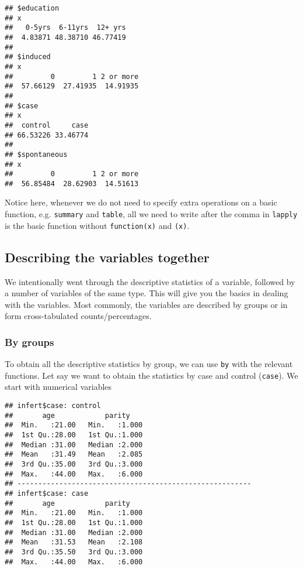 \documentclass[]{book}
\newenvironment{Shaded}{\begin{snugshade}}{\end{snugshade}}
\newcommand{\KeywordTok}[1]{\textcolor[rgb]{0.13,0.29,0.53}{\textbf{{#1}}}}
\newcommand{\StringTok}[1]{\textcolor[rgb]{0.31,0.60,0.02}{{#1}}}
\newcommand{\NormalTok}[1]{{#1}}
\theoremstyle{definition}
\theoremstyle{definition}
\theoremstyle{remark}
\begin{document}
\begin{verbatim}
## $education
## x
##   0-5yrs  6-11yrs  12+ yrs 
##  4.83871 48.38710 46.77419 
## 
## $induced
## x
##         0         1 2 or more 
##  57.66129  27.41935  14.91935 
## 
## $case
## x
##  control     case 
## 66.53226 33.46774 
## 
## $spontaneous
## x
##         0         1 2 or more 
##  56.85484  28.62903  14.51613
\end{verbatim}

Notice here, whenever we do not need to specify extra operations on a
basic function, e.g. \texttt{summary} and \texttt{table}, all we need to
write after the comma in \texttt{lapply} is the basic function without
\texttt{function(x)} and \texttt{(x)}.

\subsection{Describing the variables
together}\label{describing-the-variables-together}

We intentionally went through the descriptive statistics of a variable,
followed by a number of variables of the same type. This will give you
the basics in dealing with the variables. Most commonly, the variables
are described by groups or in form cross-tabulated counts/percentages.

\subsubsection{By groups}\label{by-groups}

To obtain all the descriptive statistics by group, we can use
\texttt{by} with the relevant functions. Let say we want to obtain the
statistics by case and control (\texttt{case}). We start with numerical
variables

\begin{Shaded}
\end{Shaded}

\begin{verbatim}
## infert$case: control
##       age            parity     
##  Min.   :21.00   Min.   :1.000  
##  1st Qu.:28.00   1st Qu.:1.000  
##  Median :31.00   Median :2.000  
##  Mean   :31.49   Mean   :2.085  
##  3rd Qu.:35.00   3rd Qu.:3.000  
##  Max.   :44.00   Max.   :6.000  
## -------------------------------------------------------- 
## infert$case: case
##       age            parity     
##  Min.   :21.00   Min.   :1.000  
##  1st Qu.:28.00   1st Qu.:1.000  
##  Median :31.00   Median :2.000  
##  Mean   :31.53   Mean   :2.108  
##  3rd Qu.:35.50   3rd Qu.:3.000  
##  Max.   :44.00   Max.   :6.000
\end{verbatim}
\end{document}
